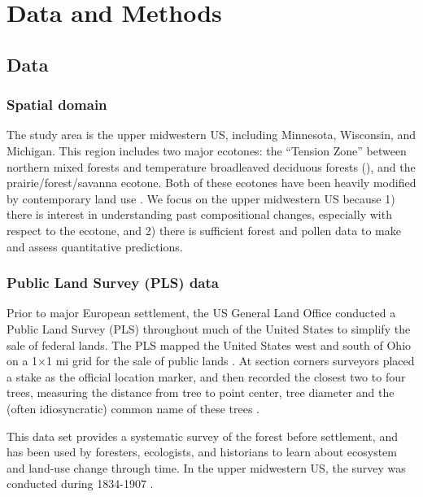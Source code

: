 \documentclass[12pt]{article}
\begin{document}
\section{Data and Methods}

\subsection{Data}

\subsubsection{Spatial domain}

The study area is the upper midwestern US, including Minnesota,
Wisconsin, and Michigan.  This region includes two major ecotones: the
``Tension Zone'' between northern mixed forests and temperature
broadleaved deciduous forests (\citet{curtis1959vegetation}), and the
prairie/forest/savanna ecotone.  Both of these ecotones have been
heavily modified by contemporary land use \citep{goring_witness}. We
focus on the upper midwestern US because 1) there is interest in
understanding past compositional changes, especially with respect to
the ecotone, and 2) there is sufficient forest and pollen data to make
and assess quantitative predictions.

\subsubsection{Public Land Survey (PLS) data}
Prior to major European settlement, the US General Land Office
conducted a Public Land Survey (PLS) throughout much of the United
States to simplify the sale of federal lands. The PLS mapped the
United States west and south of Ohio on a 1$\times$1 mi grid for the
sale of public lands \citep{stewart1935public, white1983history}. At
section corners surveyors placed a stake as the official location
marker, and then recorded the closest two to four trees, measuring the
distance from tree to point center, tree diameter and the (often
idiosyncratic) common name of these trees
\citep{mladenoff2002narrowing}.

This data set provides a systematic survey of the forest before
settlement, and has been used by foresters, ecologists, and historians
to learn about ecosystem and land-use change through time. In the
upper midwestern US, the survey was conducted during 1834-1907
\citep{stewart1935public}.
\end{document}
